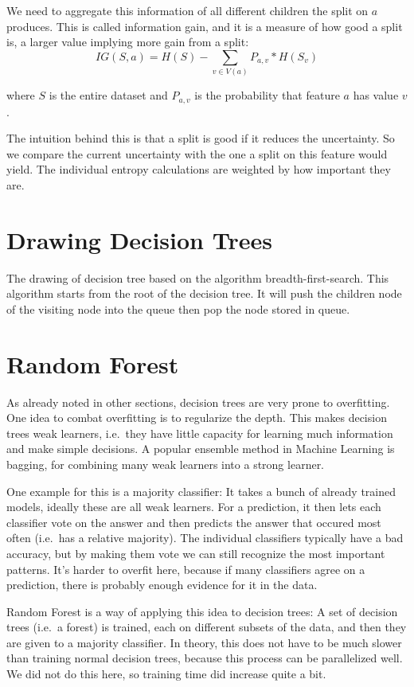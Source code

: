 \documentclass[a4paper]{article}
\begin{document}
We need to aggregate this information of all different children the split on $a$ produces. This is called information gain, and it is a measure of how good a split is, a larger value implying more gain from a split:
\[
	\mathit{IG}(S, a) = H(S) - \sum\limits_{v \in V(a)} P_{a, v} * H(S_v)
\]

\noindent where $S$ is the entire dataset and $P_{a, v}$ is the probability that feature $a$ has value $v$.

The intuition behind this is that a split is good if it reduces the uncertainty. So we compare the current uncertainty with the one a split on this feature would yield. The individual entropy calculations are weighted by how important they are.

\section{Drawing Decision Trees}
The drawing of decision tree based on the algorithm breadth-first-search. This algorithm starts from the root of the decision tree. It will push the children node of the visiting node into the queue then pop the node stored in queue.


\section{Random Forest}

As already noted in other sections, decision trees are very prone to overfitting. One idea to combat overfitting is to regularize the depth. This makes decision trees weak learners, i.e.\ they have little capacity for learning much information and make simple decisions. A popular ensemble method in Machine Learning is bagging, for combining many weak learners into a strong learner.

One example for this is a majority classifier: It takes a bunch of already trained models, ideally these are all weak learners. For a prediction, it then lets each classifier vote on the answer and then predicts the answer that occured most often (i.e.\ has a relative majority). The individual classifiers typically have a bad accuracy, but by making them vote we can still recognize the most important patterns. It's harder to overfit here, because if many classifiers agree on a prediction, there is probably enough evidence for it in the data.

Random Forest is a way of applying this idea to decision trees: A set of decision trees (i.e.\ a forest) is trained, each on different subsets of the data, and then they are given to a majority classifier. In theory, this does not have to be much slower than training normal decision trees, because this process can be parallelized well. We did not do this here, so training time did increase quite a bit.
\end{document}
